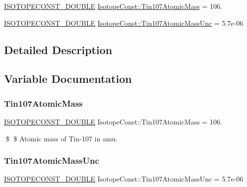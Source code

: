 \begin{DoxyCompactItemize}
\item 
\mbox{\hyperlink{group___isotope_const-_macros_ga8f45a7272ce02c0b4c65c44636ed719a}{I\+S\+O\+T\+O\+P\+E\+C\+O\+N\+S\+T\+\_\+\+D\+O\+U\+B\+LE}} \mbox{\hyperlink{group___isotope_const-_tin-_sn107_ga92e3be3e5c2ea12c933e5b723ff62c2c}{Isotope\+Const\+::\+Tin107\+Atomic\+Mass}} = 106.
\item 
\mbox{\hyperlink{group___isotope_const-_macros_ga8f45a7272ce02c0b4c65c44636ed719a}{I\+S\+O\+T\+O\+P\+E\+C\+O\+N\+S\+T\+\_\+\+D\+O\+U\+B\+LE}} \mbox{\hyperlink{group___isotope_const-_tin-_sn107_ga4fcb80242d4a9d62572bfab03fea394e}{Isotope\+Const\+::\+Tin107\+Atomic\+Mass\+Unc}} = 5.\+7e-\/06
\end{DoxyCompactItemize}


\subsection{Detailed Description}


\subsection{Variable Documentation}
\mbox{\label{group___isotope_const-_tin-_sn107_ga92e3be3e5c2ea12c933e5b723ff62c2c}} 
\subsubsection{\texorpdfstring{Tin107\+Atomic\+Mass}{Tin107AtomicMass}}
{\footnotesize\ttfamily \mbox{\hyperlink{group___isotope_const-_macros_ga8f45a7272ce02c0b4c65c44636ed719a}{I\+S\+O\+T\+O\+P\+E\+C\+O\+N\+S\+T\+\_\+\+D\+O\+U\+B\+LE}} Isotope\+Const\+::\+Tin107\+Atomic\+Mass = 106.}

\$ \$ Atomic mass of Tin-\/107 in amu. \mbox{\label{group___isotope_const-_tin-_sn107_ga4fcb80242d4a9d62572bfab03fea394e}} 
\subsubsection{\texorpdfstring{Tin107\+Atomic\+Mass\+Unc}{Tin107AtomicMassUnc}}
{\footnotesize\ttfamily \mbox{\hyperlink{group___isotope_const-_macros_ga8f45a7272ce02c0b4c65c44636ed719a}{I\+S\+O\+T\+O\+P\+E\+C\+O\+N\+S\+T\+\_\+\+D\+O\+U\+B\+LE}} Isotope\+Const\+::\+Tin107\+Atomic\+Mass\+Unc = 5.\+7e-\/06}

